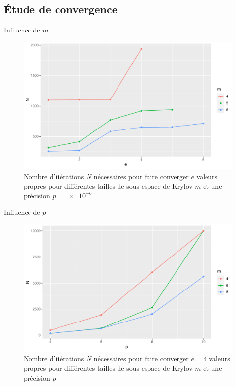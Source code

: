 \documentclass[9.5pt]{beamer}
\begin{document}
	\subsection{\'Etude de convergence}
		\begin{frame}{Influence de $m$}
			\begin{figure}
				\centering
				\includegraphics[width=0.8\linewidth, keepaspectratio]{../rapport/plots/Nvse-m_p6.pdf}
				\caption{Nombre d'itérations $N$ nécessaires pour faire converger $e$ valeurs propres pour différentes tailles de sous-espace de Krylov $m$ et une précision $p=\SI{e-6}{}$ \label{fig:Nvse-m_p6}}
			\end{figure}
		\end{frame}

		\begin{frame}{Influence de $p$}
			\begin{figure}
				\centering
				\includegraphics[width=0.8\linewidth, keepaspectratio]{../rapport/plots/Nvsp-m_e4.pdf}
				\caption{Nombre d'itérations $N$ nécessaires pour faire converger $e = 4$ valeurs propres pour différentes tailles de sous-espace de Krylov $m$ et une précision $p$ \label{fig:Nvsp-m_e4}}
			\end{figure}
		\end{frame}
\end{document}
